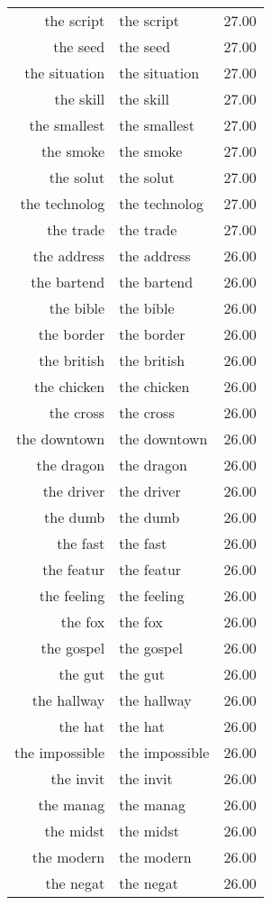 \begin{table}[ht]
\begin{tabular}{rlr}
  the script & the script & 27.00 \\ 
  the seed & the seed & 27.00 \\ 
  the situation & the situation & 27.00 \\ 
  the skill & the skill & 27.00 \\ 
  the smallest & the smallest & 27.00 \\ 
  the smoke & the smoke & 27.00 \\ 
  the solut & the solut & 27.00 \\ 
  the technolog & the technolog & 27.00 \\ 
  the trade & the trade & 27.00 \\ 
  the address & the address & 26.00 \\ 
  the bartend & the bartend & 26.00 \\ 
  the bible & the bible & 26.00 \\ 
  the border & the border & 26.00 \\ 
  the british & the british & 26.00 \\ 
  the chicken & the chicken & 26.00 \\ 
  the cross & the cross & 26.00 \\ 
  the downtown & the downtown & 26.00 \\ 
  the dragon & the dragon & 26.00 \\ 
  the driver & the driver & 26.00 \\ 
  the dumb & the dumb & 26.00 \\ 
  the fast & the fast & 26.00 \\ 
  the featur & the featur & 26.00 \\ 
  the feeling & the feeling & 26.00 \\ 
  the fox & the fox & 26.00 \\ 
  the gospel & the gospel & 26.00 \\ 
  the gut & the gut & 26.00 \\ 
  the hallway & the hallway & 26.00 \\ 
  the hat & the hat & 26.00 \\ 
  the impossible & the impossible & 26.00 \\ 
  the invit & the invit & 26.00 \\ 
  the manag & the manag & 26.00 \\ 
  the midst & the midst & 26.00 \\ 
  the modern & the modern & 26.00 \\ 
  the negat & the negat & 26.00 \\ 

\end{tabular}
\end{table}
